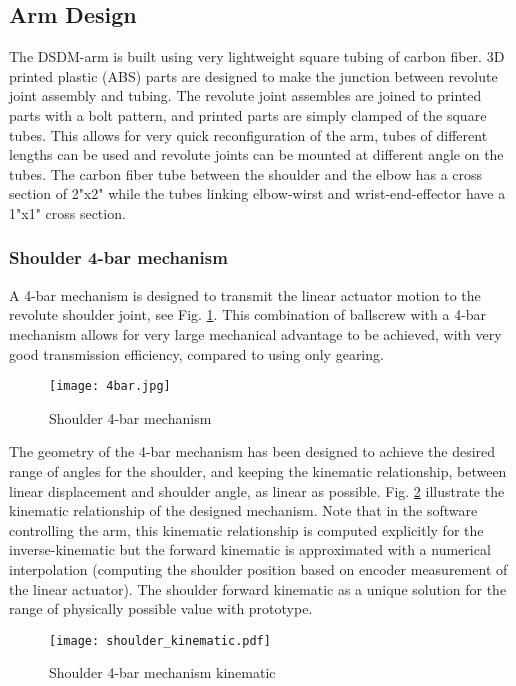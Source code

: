 \subsection{Arm Design}
\label{sec:DSDMArm}

The DSDM-arm is built using very lightweight square tubing of carbon fiber. 3D printed plastic (ABS) parts are designed to make the junction between revolute joint assembly and tubing. The revolute joint assembles are joined to printed parts with a bolt pattern, and printed parts are simply clamped of the square tubes. This allows for very quick reconfiguration of the arm, tubes of different lengths can be used and revolute joints can be mounted at different angle on the tubes. The carbon fiber tube between the shoulder and the elbow has a cross section of 2"x2" while the tubes linking elbow-wirst and wrist-end-effector have a 1"x1" cross section. 

\subsubsection{Shoulder 4-bar mechanism}

A 4-bar mechanism is designed to transmit the linear actuator motion to the revolute shoulder joint, see Fig. \ref{fig:4bar}. This combination of ballscrew with a 4-bar mechanism allows for very large mechanical advantage to be achieved, with very good transmission efficiency, compared to using only gearing.  

\begin{figure}[htbp]
	\centering
		\texttt{[image: 4bar.jpg]}
	\caption{Shoulder 4-bar mechanism}
	\label{fig:4bar}
\end{figure}

The geometry of the 4-bar mechanism has been designed to achieve the desired range of angles for the shoulder, and keeping the kinematic relationship, between linear displacement and shoulder angle, as linear as possible. Fig. \ref{fig:shoulder_kinematic} illustrate the kinematic relationship of the designed mechanism. Note that in the software controlling the arm, this kinematic relationship is computed explicitly for the inverse-kinematic but the forward kinematic is approximated with a numerical interpolation (computing the shoulder position based on encoder measurement of the linear actuator). The shoulder forward kinematic as a unique solution for the range of physically possible value with prototype.

\begin{figure}[htbp]
	\centering
		\texttt{[image: shoulder\_kinematic.pdf]}
	\caption{Shoulder 4-bar mechanism kinematic}
	\label{fig:shoulder_kinematic}
\end{figure}

